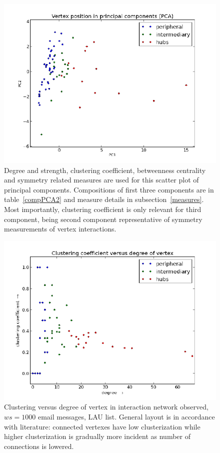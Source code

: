 \documentclass[%
 aip,
 jmp,%
 amsmath,amssymb,
 reprint,%
]{revtex4-1}
\begin{document}
\begin{figure} 
   \centering
        \includegraphics[width=\columnwidth]{figs/ev0pr1PCA}
    \caption{Degree and strength, clustering coefficient, betweenness centrality and symmetry related measures are used for this scatter plot of principal components. Compositions of first three components are in table~\ref{compPCA2} and measure details in subsection~\ref{measures}. Most importantly, clustering coefficient is only relevant for third component, being second component representative of symmetry measurements of vertex interactions.}
    \label{PCA2}
\end{figure}


\begin{figure} 
   \centering
        \includegraphics[width=\columnwidth]{figs/ev0pr11CC}
    \caption{Clustering versus degree of vertex in interaction network observed, $ws = 1000$ email messages, LAU list. General layout is in accordance with literature: connected vertexes have low clusterization while higher clusterization is gradually more incident as number of connections is lowered.}
    \label{clust}
\end{figure}
\end{document}
